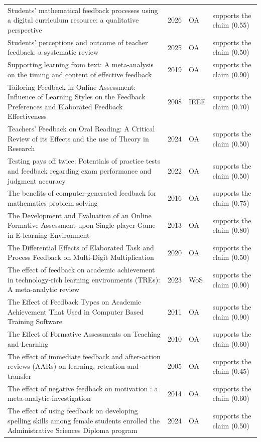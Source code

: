 \begin{longtable}{@{}%
  >{\raggedright\arraybackslash}p{}c%
  >{\raggedright\arraybackslash}p{}%
  >{\raggedright\arraybackslash}p{}@{}}
Students' mathematical feedback processes using a digital curriculum resource: a qualitative perspective & 2026 & OA & supports the claim (0.55) \\
Students' perceptions and outcome of teacher feedback: a systematic review & 2025 & OA & supports the claim (0.50) \\
Supporting learning from text: A meta-analysis on the timing and content of effective feedback & 2019 & OA & supports the claim (0.90) \\
Tailoring Feedback in Online Assessment: Influence of Learning Styles on the Feedback Preferences and Elaborated Feedback Effectiveness & 2008 & IEEE & supports the claim (0.70) \\
Teachers' Feedback on Oral Reading: A Critical Review of its Effects and the use of Theory in Research & 2024 & OA & supports the claim (0.50) \\
Testing pays off twice: Potentials of practice tests and feedback regarding exam performance and judgment accuracy & 2022 & OA & supports the claim (0.50) \\
The benefits of computer-generated feedback for mathematics problem solving & 2016 & OA & supports the claim (0.75) \\
The Development and Evaluation of an Online Formative Assessment upon Single-player Game in E-learning Environment & 2013 & OA & supports the claim (0.80) \\
The Differential Effects of Elaborated Task and Process Feedback on Multi-Digit Multiplication & 2020 & OA & supports the claim (0.50) \\
The effect of feedback on academic achievement in technology-rich learning environments (TREs): A meta-analytic review & 2023 & WoS & supports the claim (0.90) \\
The Effect of Feedback Types on Academic Achievement That Used in Computer Based Training Software & 2011 & OA & supports the claim (0.90) \\
The Effect of Formative Assessments on Teaching and Learning & 2010 & OA & supports the claim (0.60) \\
The effect of immediate feedback and after-action reviews (AARs) on learning, retention and transfer & 2005 & OA & supports the claim (0.45) \\
The effect of negative feedback on motivation : a meta-analytic investigation & 2014 & OA & supports the claim (0.60) \\
The effect of using feedback on developing spelling skills among female students enrolled the Administrative Sciences Diploma program & 2024 & OA & supports the claim (0.50) \\

\end{longtable}
